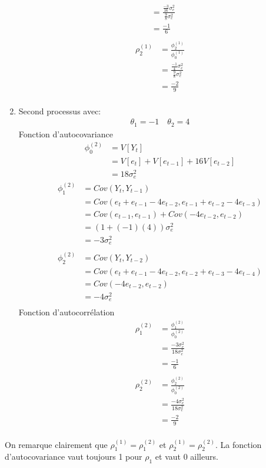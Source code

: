 \begin{exercice}
\begin{sol}
\begin{enumerate}
\begin{align*}
&= \frac{\frac{-3}{16}\sigma^2_e}{\frac{9}{8}\sigma^2_e} \\
&= \frac{-1}{6} \\
\end{align*}
\begin{align*}
\rho_2^{(1)} &= \frac{\phi_2^{(1)}}{\phi_0^{(1)}} \\
&= \frac{\frac{-1}{4}\sigma^2_e}{\frac{9}{8}\sigma^2_e} \\
&= \frac{-2}{9} \\
\end{align*}
\item Second processus avec:
\begin{align*}
\theta_1 = -1 \quad \theta_2 = 4
\end{align*}
Fonction d'autocovariance
\begin{align*}
\phi_0^{(2)} &= V[Y_t] \\
&= V[e_t]+V[e_{t-1}]+16V[e_{t-2}] \\
&= 18 \sigma^2_e
\end{align*}
\begin{align*}
\phi_1^{(2)} &= Cov(Y_t,Y_{t-1}) \\
&= Cov(e_t + e_{t-1} - 4e_{t-2}, e_{t-1} + e_{t-2} - 4e_{t-3}) \\
&= Cov(e_{t-1},e_{t-1}) + Cov(-4e_{t-2},e_{t-2}) \\
&= (1 + (-1)(4))\sigma^2_e \\
&= -3\sigma^2_e \\
\end{align*}
\begin{align*}
\phi_2^{(2)} &= Cov(Y_t,Y_{t-2}) \\
&= Cov(e_t + e_{t-1} - 4e_{t-2}, e_{t-2} + e_{t-3} - 4e_{t-4} )\\
&= Cov(- 4e_{t-2},e_{t-2}) \\
&= -4\sigma^2_e \\
\end{align*}
Fonction d'autocorrélation
\begin{align*}
\rho_1^{(2)} &= \frac{\phi_1^{(2)}}{\phi_0^{(2)}} \\
&= \frac{-3\sigma^2_e}{18\sigma^2_e} \\
&= \frac{-1}{6} \\
\end{align*}
\begin{align*}
\rho_2^{(2)} &= \frac{\phi_2^{(2)}}{\phi_0^{(2)}} \\
&= \frac{-4\sigma^2_e}{18\sigma^2_e} \\
&= \frac{-2}{9} \\
\end{align*}
\end{enumerate}

On remarque clairement que $\rho_1^{(1)} = \rho_1^{(2)}$ et $\rho_2^{(1)} = \rho_2^{(2)}$. 
La fonction d'autocovariance vaut toujours 1 pour $\rho_1$ et vaut 0 ailleurs.
  \end{sol}
\end{exercice}


